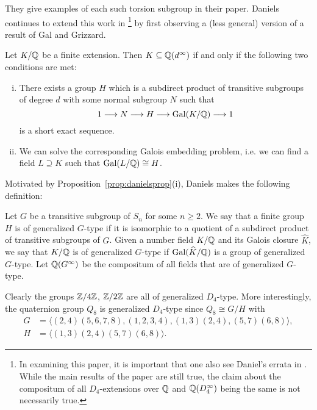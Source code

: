 They give examples of each such torsion subgroup in their paper. Daniels continues to extend this work in \cite{daniels18}\footnote{In examining this paper, it is important that one also see Daniel's errata in \cite{daniels21}. While the main results of the paper are still true, the claim about the compositum of all $D_4$-extensions over $\mathbb{Q}$ and $\mathbb{Q}(D_4^\infty)$ being the same is not necessarily true.} by first observing a (less general) version of a result of Gal and Grizzard.


\begin{prop} \label{prop:danielsprop}
Let $K/\mathbb{Q}$ be a finite extension. Then $K \subseteq \mathbb{Q}(d^\infty)$ if and only if the following two conditions are met:
	\begin{enumerate}[(i)]
	\item There exists a group $H$ which is a subdirect product of transitive subgroups of degree $d$ with some normal subgroup $N$ such that
		\[
		1 \stackrel{}{\longrightarrow} N \stackrel{}{\longrightarrow} H \stackrel{}{\longrightarrow} \operatorname{Gal}(K/\mathbb{Q}) \stackrel{}{\longrightarrow} 1
		\]
	is a short exact sequence. 
	\item We can solve the corresponding Galois embedding problem, i.e. we can find a field $L \supseteq K$ such that $\operatorname{Gal}(L/\mathbb{Q}) \cong H$. 
	\end{enumerate}
\end{prop}


Motivated by Proposition~\ref{prop:danielsprop}(i), Daniels makes the following definition: 


\begin{dfn}
Let $G$ be a transitive subgroup of $S_n$ for some $n \geq 2$. We say that a finite group $H$ is of generalized $G$-type if it is isomorphic to a quotient of a subdirect product of transitive subgroups of $G$. Given a number field $K/\mathbb{Q}$ and its Galois closure $\widehat{K}$, we say that $K/\mathbb{Q}$ is of generalized $G$-type if $\operatorname{Gal}(\widehat{K}/\mathbb{Q})$ is a group of generalized $G$-type. Let $\mathbb{Q}(G^\infty)$ be the compositum of all fields that are of generalized $G$-type. 
\end{dfn}


\begin{ex}
Clearly the groups $\mathbb{Z}/4\mathbb{Z}$, $\mathbb{Z}/2\mathbb{Z}$ are all of generalized $D_4$-type. More interestingly, the quaternion group $Q_8$ is generalized $D_4$-type since $Q_8 \cong G/H$ with
	\[
	\begin{aligned}
	G&= \langle (2,4)(5,6,7,8), (1,2,3,4),(1,3)(2,4),(5,7)(6,8) \rangle, \\
	H&= \langle (1,3)(2,4)(5,7)(6,8) \rangle.
	\end{aligned}
	\]
\end{ex}


